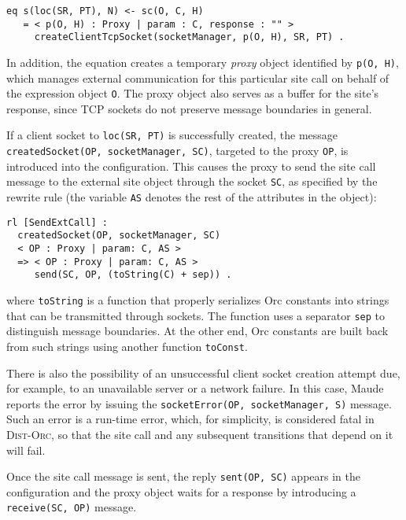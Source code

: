 \documentclass{eptcs}
\begin{document}
\begin{small}
\begin{verbatim}
eq s(loc(SR, PT), N) <- sc(O, C, H)  
   = < p(O, H) : Proxy | param : C, response : "" >
     createClientTcpSocket(socketManager, p(O, H), SR, PT) .
\end{verbatim}
\end{small}

\noindent In addition, the equation creates a temporary \emph{proxy} object identified by \texttt{p(O, H)}, which manages external communication for this particular site call on behalf of the expression object \texttt{O}. The proxy object also serves as a buffer for the site's response, since TCP sockets do not preserve message boundaries in general.

If a client socket to \texttt{loc(SR, PT)} is successfully created, the message \texttt{ createdSocket(OP, socketManager, SC)}, targeted to the proxy \texttt{OP}, is introduced into the configuration. This causes the proxy to send the site call message to the external site object through the socket \texttt{SC}, as specified by the rewrite rule (the variable \texttt{AS} denotes the rest of the attributes in the object):

\begin{small}
\begin{verbatim}
rl [SendExtCall] :
  createdSocket(OP, socketManager, SC) 
  < OP : Proxy | param: C, AS >
  => < OP : Proxy | param: C, AS > 
     send(SC, OP, (toString(C) + sep)) .
\end{verbatim}
\end{small}

\noindent where \texttt{toString} is a function that properly serializes Orc constants into strings that can be transmitted through sockets. The function uses a separator \texttt{sep} to distinguish message boundaries. 
At the other end, Orc constants are built back from such strings using another function \texttt{toConst}. 

There is also the possibility of an unsuccessful client socket creation attempt due, for example, to an unavailable server or a network failure. In this case, Maude reports the error by issuing the \texttt{socketError(OP, socketManager, S)} message. Such an error is a run-time error, which, for simplicity, is considered fatal in \textsc{Dist-Orc}, so that the site call and any subsequent transitions that depend on it will fail.

Once the site call message is sent, the reply \texttt{sent(OP, SC)} appears in the configuration and the proxy object waits for a response by introducing a \texttt{receive(SC, OP)} message. 
\end{document}
